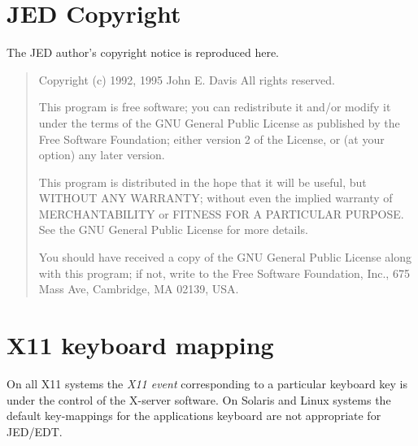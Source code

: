 \documentclass[twoside,11pt]{article}
\newcommand{\xlabel}[1]{}
\begin{document}
\section{JED Copyright\xlabel{copyright}}
\label{jed-cr}
The JED author's copyright notice is reproduced here.
\begin{quote}
 Copyright (c) 1992, 1995 John E. Davis
 All rights reserved.

 This program is free software; you can redistribute it and/or modify it
 under the terms of the GNU General Public License as published by the Free
 Software Foundation; either version 2 of the License, or (at your option)
 any later version.

 This program is distributed in the hope that it will be useful, but WITHOUT
 ANY WARRANTY; without even the implied warranty of MERCHANTABILITY or
 FITNESS FOR A PARTICULAR PURPOSE\@.  See the GNU General Public License for
 more details.

 You should have received a copy of the GNU General Public License along
 with this program; if not, write to the Free Software Foundation, Inc., 675
 Mass Ave, Cambridge, MA 02139, USA. 
\end{quote}

\newpage
\appendix
\section{\xlabel{x11_keyboard_mapping}X11 keyboard mapping}
\label{x11_keyboard_mapping}
\label{kb-remap}

On all X11 systems the \textit{X11 event} corresponding to a particular
keyboard key is under the control of the X-server software. On Solaris
and Linux systems the default key-mappings for the applications keyboard
are not appropriate for JED/EDT.
\end{document}
